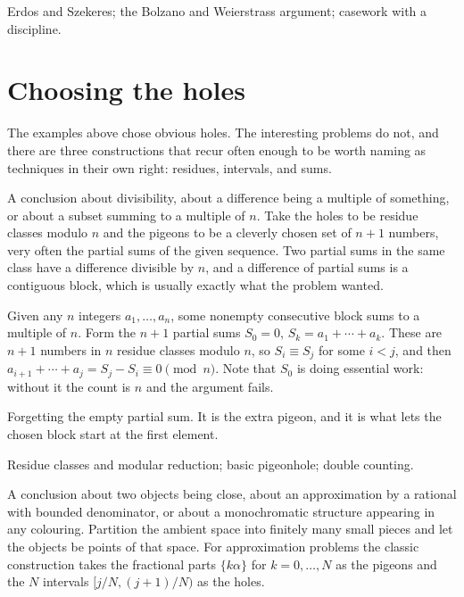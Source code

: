 \begin{seealsob}Erdos and Szekeres; the Bolzano and Weierstrass argument; casework with a discipline.\end{seealsob}

\section{Choosing the holes}

The examples above chose obvious holes. The interesting problems do not, and there are three constructions that recur often enough to be worth naming as techniques in their own right: residues, intervals, and sums.

\cue A conclusion about divisibility, about a difference being a multiple of something, or about a subset summing to a multiple of $n$.
\method Take the holes to be residue classes modulo $n$ and the pigeons to be a cleverly chosen set of $n+1$ numbers, very often the partial sums of the given sequence. Two partial sums in the same class have a difference divisible by $n$, and a difference of partial sums is a contiguous block, which is usually exactly what the problem wanted.

\begin{worked}
Given any $n$ integers $a_{1},\ldots,a_{n}$, some nonempty consecutive block sums to a multiple of $n$. Form the $n+1$ partial sums $S_{0}=0$, $S_{k}=a_{1}+\cdots+a_{k}$. These are $n+1$ numbers in $n$ residue classes modulo $n$, so $S_{i}\equiv S_{j}$ for some $i<j$, and then $a_{i+1}+\cdots+a_{j}=S_{j}-S_{i}\equiv0\pmod n$. Note that $S_{0}$ is doing essential work: without it the count is $n$ and the argument fails.
\end{worked}

\begin{trap}
Forgetting the empty partial sum. It is the extra pigeon, and it is what lets the chosen block start at the first element.
\end{trap}

\begin{seealsob}Residue classes and modular reduction; basic pigeonhole; double counting.\end{seealsob}

\cue A conclusion about two objects being close, about an approximation by a rational with bounded denominator, or about a monochromatic structure appearing in any colouring.
\method Partition the ambient space into finitely many small pieces and let the objects be points of that space. For approximation problems the classic construction takes the fractional parts $\{k\alpha\}$ for $k=0,\ldots,N$ as the pigeons and the $N$ intervals $[j/N,(j+1)/N)$ as the holes.

